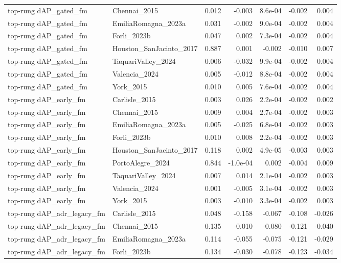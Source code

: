 \begin{tabular}{llrrrrr}
top-rung dAP\_gated\_fm & Chennai\_2015 & 0.012 & -0.003 & 8.6e-04 & -0.002 & 0.004 \\
top-rung dAP\_gated\_fm & EmiliaRomagna\_2023a & 0.031 & -0.002 & 9.0e-04 & -0.002 & 0.004 \\
top-rung dAP\_gated\_fm & Forli\_2023b & 0.047 & 0.002 & 7.3e-04 & -0.002 & 0.004 \\
top-rung dAP\_gated\_fm & Houston\_SanJacinto\_2017 & 0.887 & 0.001 & -0.002 & -0.010 & 0.007 \\
top-rung dAP\_gated\_fm & TaquariValley\_2024 & 0.006 & -0.032 & 9.9e-04 & -0.002 & 0.004 \\
top-rung dAP\_gated\_fm & Valencia\_2024 & 0.005 & -0.012 & 8.8e-04 & -0.002 & 0.004 \\
top-rung dAP\_gated\_fm & York\_2015 & 0.010 & 0.005 & 7.6e-04 & -0.002 & 0.004 \\
top-rung dAP\_early\_fm & Carlisle\_2015 & 0.003 & 0.026 & 2.2e-04 & -0.002 & 0.002 \\
top-rung dAP\_early\_fm & Chennai\_2015 & 0.009 & 0.004 & 2.7e-04 & -0.002 & 0.003 \\
top-rung dAP\_early\_fm & EmiliaRomagna\_2023a & 0.005 & -0.025 & 6.8e-04 & -0.002 & 0.003 \\
top-rung dAP\_early\_fm & Forli\_2023b & 0.010 & 0.008 & 2.2e-04 & -0.002 & 0.003 \\
top-rung dAP\_early\_fm & Houston\_SanJacinto\_2017 & 0.118 & 0.002 & 4.9e-05 & -0.003 & 0.003 \\
top-rung dAP\_early\_fm & PortoAlegre\_2024 & 0.844 & -1.0e-04 & 0.002 & -0.004 & 0.009 \\
top-rung dAP\_early\_fm & TaquariValley\_2024 & 0.007 & 0.014 & 2.1e-04 & -0.002 & 0.003 \\
top-rung dAP\_early\_fm & Valencia\_2024 & 0.001 & -0.005 & 3.1e-04 & -0.002 & 0.003 \\
top-rung dAP\_early\_fm & York\_2015 & 0.003 & -0.010 & 3.3e-04 & -0.002 & 0.003 \\
top-rung dAP\_adr\_legacy\_fm & Carlisle\_2015 & 0.048 & -0.158 & -0.067 & -0.108 & -0.026 \\
top-rung dAP\_adr\_legacy\_fm & Chennai\_2015 & 0.135 & -0.010 & -0.080 & -0.121 & -0.040 \\
top-rung dAP\_adr\_legacy\_fm & EmiliaRomagna\_2023a & 0.114 & -0.055 & -0.075 & -0.121 & -0.029 \\
top-rung dAP\_adr\_legacy\_fm & Forli\_2023b & 0.134 & -0.030 & -0.078 & -0.123 & -0.034 \\

\end{tabular}

